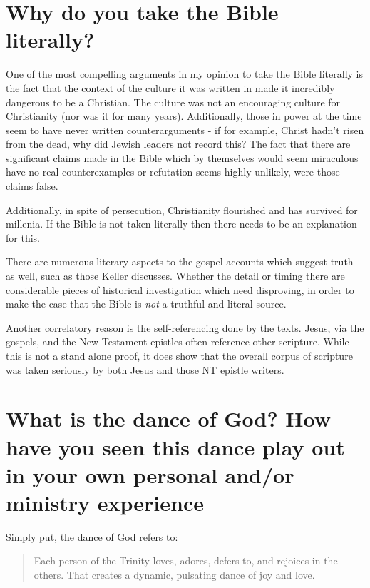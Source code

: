 \documentclass[12pt]{turabian-researchpaper}
\begin{document}
\section{Why do you take the Bible literally?}

One of the most compelling arguments in my opinion to take the Bible literally is the fact that the context of the culture it was written in made it incredibly dangerous to be a Christian. The culture was not an encouraging culture for Christianity (nor was it for many years). Additionally, those in power at the time seem to have never written counterarguments - if for example, Christ hadn't risen from the dead, why did Jewish leaders not record this? The fact that there are significant claims made in the Bible which by themselves would seem miraculous have no real counterexamples or refutation seems highly unlikely, were those claims false.

Additionally, in spite of  persecution, Christianity flourished and has survived for millenia. If the Bible is not taken literally then there needs to be an explanation for this.

There are numerous literary aspects to the gospel accounts which suggest truth as well, such as those Keller discusses. Whether the detail\autocite[pg.110-111]{keller2008reason} or timing\autocite[pg.104]{keller2008reason} there are considerable pieces of historical investigation which need disproving, in order to make the case that the Bible is \textit{not} a truthful and literal source.

Another correlatory reason is the self-referencing done by the texts. Jesus, via the gospels, and the New Testament epistles often reference other scripture. While this is not a stand alone proof, it does show that the overall corpus of scripture was taken seriously by both Jesus and those NT epistle writers.

\section{What is the dance of God? How have you seen this dance play out in your own personal and/or ministry experience}

Simply put, the dance of God refers to:\autocite[pg.224]{keller2008reason}

\begin{quotation}
Each person of the Trinity loves, adores, defers to, and rejoices in the others. That creates a dynamic, pulsating dance of joy and love.
\end{quotation}
\end{document}
